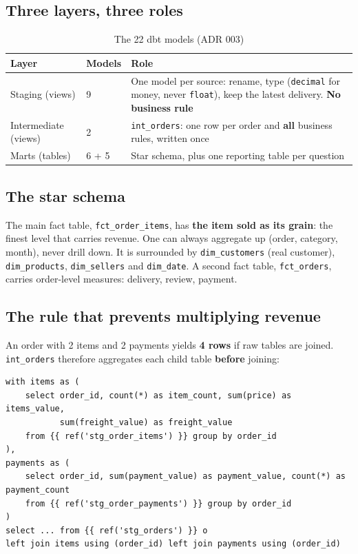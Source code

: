 \documentclass[11pt, a4paper, oneside, headings=normal, numbers=noenddot, DIV=12]{scrartcl}
\begin{document}
\subsection{Three layers, three roles}
\begin{table}[H]
\centering\small
\begin{tabularx}{\linewidth}{@{}L{2.6cm} L{2.2cm} Y@{}}
\toprule
\textbf{Layer} & \textbf{Models} & \textbf{Role} \\
\midrule
Staging (views) & 9 & One model per source: rename, type (\texttt{decimal} for money, never \texttt{float}), keep the latest delivery. \textbf{No business rule} \\
Intermediate (views) & 2 & \texttt{int\_orders}: one row per order and \textbf{all} business rules, written once \\
Marts (tables) & 6 + 5 & Star schema, plus one reporting table per question \\
\bottomrule
\end{tabularx}
\caption{The 22 dbt models (ADR 003)}
\end{table}

\subsection{The star schema}
The main fact table, \texttt{fct\_order\_items}, has \textbf{the item sold as its grain}: the finest level that carries revenue. One can
always aggregate up (order, category, month), never drill down. It is surrounded by \texttt{dim\_customers} (real customer),
\texttt{dim\_products}, \texttt{dim\_sellers} and \texttt{dim\_date}. A second fact table, \texttt{fct\_orders}, carries order-level
measures: delivery, review, payment.

\subsection{The rule that prevents multiplying revenue}
An order with 2 items and 2 payments yields \textbf{4 rows} if raw tables are joined. \texttt{int\_orders} therefore aggregates each child
table \textbf{before} joining:

\begin{lstlisting}[language=DuckSQL]
with items as (
    select order_id, count(*) as item_count, sum(price) as items_value,
           sum(freight_value) as freight_value
    from {{ ref('stg_order_items') }} group by order_id
),
payments as (
    select order_id, sum(payment_value) as payment_value, count(*) as payment_count
    from {{ ref('stg_order_payments') }} group by order_id
)
select ... from {{ ref('stg_orders') }} o
left join items using (order_id) left join payments using (order_id)
\end{lstlisting}
\end{document}
